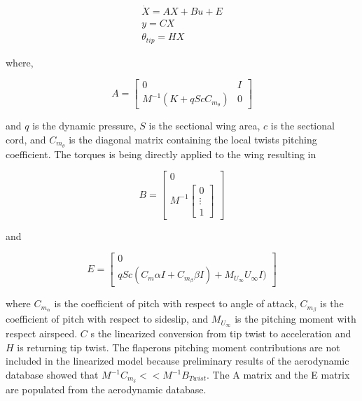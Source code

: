 \documentclass[11pt]{ucthesis}
\begin{document}
\begin{equation}
\begin{matrix}
\dot{X} = AX + Bu+E\\
y = CX\\
\theta_{tip} = HX
\end{matrix}
\label{eqn:Asys}
\end{equation}

where,

\begin{equation}
A = \begin{bmatrix}
0&I\\
M^{-1}(K+qScC_{m_{\theta}})&0
\end{bmatrix}
\end{equation}

and $q$ is the dynamic pressure, $S$ is the sectional wing area, $c$ is the sectional cord, and $C_{m_{\theta}}$ is the diagonal matrix containing the local twists pitching coefficient. The torques is being directly applied to the wing resulting in 

\begin{equation}
B = \begin{bmatrix}
0\\
M^{-1}\begin{bmatrix}
0\\\vdots\\1\end{bmatrix}
\end{bmatrix}
\end{equation}

and

\begin{equation}
E = \begin{bmatrix}
0\\
qSc(C_m\alpha I+C_{m_{\beta}}\beta I)+M_{U_{\infty}}U_{\infty}I)
\end{bmatrix}
\end{equation}

where $C_{m_{\alpha}}$ is the coefficient of pitch with respect to angle of attack, $C_{m_{\beta}}$ is the coefficient of pitch with respect to sideslip, and $M_{U_{\infty}}$ is the pitching moment with respect airspeed. $C$ s the linearized conversion from tip twist to acceleration and $H$ is returning tip twist. The flaperons pitching moment contributions are not included in the linearized model because preliminary results of the aerodynamic database showed that $M^{-1}C_{m_{\delta}}<<M^{-1}B_{Twist}$. The A matrix and the E matrix are populated from the aerodynamic database.
\end{document}
